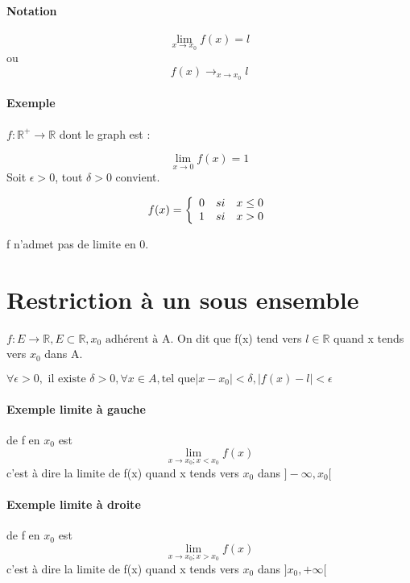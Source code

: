 \paragraph{Notation} \[\lim_{x \to x_0} f(x) = l\] ou \[f(x) \rightarrow_{x \to x_0} l\]
\paragraph{Exemple} $ f:\mathbb{R}^+ \rightarrow \mathbb{R}$ dont le graph est :


\[ \lim_{x \to 0} f(x) = 1\] Soit $\epsilon > 0$, tout $\delta > 0$ convient.


\[f(x) = 
\left\{
\begin{array}{r c l}
	0 & si & x \leq 0 \\
	1 & si & x > 0
\end{array}
\right.
\]

f n'admet pas de limite en 0.

\section{Restriction à un sous ensemble}
$f : E \rightarrow \mathbb{R}, E \subset \mathbb{R}, x_0 \text{ adhérent à A.}$
On dit que f(x) tend vers $l \in \mathbb{R}$ quand x tends vers $x_0$ dans A.

$\forall \epsilon > 0, \text{ il existe } \delta > 0, \forall x \in A, \text{tel que} |x-x_0| < \delta, |f(x) - l| < \epsilon$

\paragraph{Exemple limite à gauche} de f en $x_0$ est \[ \lim_{x \to x_0 ; x < x_0} f(x)\] c'est à dire la limite de f(x) quand x tends vers $x_0$ dans $]-\infty, x_0[$
\paragraph{Exemple limite à droite} de f en $x_0$ est \[ \lim_{x \to x_0 ; x > x_0} f(x)\] c'est à dire la limite de f(x) quand x tends vers $x_0$ dans $]x_0, +\infty[$


